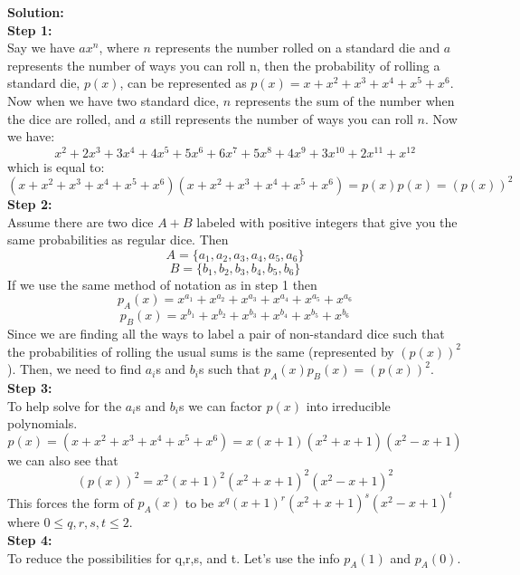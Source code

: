 \documentclass[10pt,a4paper]{report}
\begin{document}
	\newline
	\textbf{Solution: }\\
	\newline
	\textbf{Step 1:}\\
	Say we have $ax^n$, where $n$ represents the number rolled on a standard die and $a$ represents the number of ways you can roll n, then the probability of rolling a standard die, $p(x)$, can be represented as $p(x) = x + x^2 + x^3 + x^4 + x^5 + x^6$.\\
	Now when we have two standard dice, $n$ represents the sum of the number when the dice are rolled, and $a$ still represents the number of ways you can roll $n$.  Now we have:\\
	\[x^2 + 2x^3 + 3x^4 + 4x^5 + 5x^6 + 6x^7 + 5x^8 + 4x^9 + 3x^{10} + 2x^{11} + x^{12} \]
	which is equal to:\\
	\[(x + x^2 + x^3 + x^4 + x^5 + x^6)(x + x^2 + x^3 + x^4 + x^5 + x^6) = p(x)p(x) = (p(x))^2 \]
	\newline
	\textbf{Step 2:}\\
	Assume there are two dice $A+B$ labeled with positive integers that give you the same probabilities as regular dice.  Then \[A = \{a_1, a_2, a_3, a_4, a_5, a_6 \}\]
	\[B = \{b_1, b_2, b_3, b_4, b_5, b_6 \}\]
	If we use the same method of notation as in step 1 then
	\[p_A(x) = x^{a_1} + x^{a_2} + x^{a_3} + x^{a_4} + x^{a_5} + x^{a_6}\]
	\[p_B(x) = x^{b_1} + x^{b_2} + x^{b_3} + x^{b_4} + x^{b_5} + x^{b_6} \]
	Since we are finding all the ways to label a pair of non-standard dice such that the probabilities of rolling the usual sums is the same (represented by $(p(x))^2$).  Then, we need to find $a_i$s and $b_i$s such that $p_A(x)p_B(x) = (p(x))^2$.\\
	\newline
	\textbf{Step 3:}\\
	To help solve for the $a_i$s and $b_i$s we can factor $p(x)$ into irreducible polynomials.
	\[p(x) = (x + x^2 + x^3 + x^4 + x^5 + x^6) = x(x+1)(x^2 + x + 1)(x^2 - x + 1) \]
	we can also see that\\
	\[(p(x))^2 = x^2(x+1)^2(x^2 + x + 1)^2(x^2 - x + 1)^2 \]
	This forces the form of $p_A(x)$ to be $x^q(x+1)^r(x^2+x+1)^s(x^2-x+1)^t$ where $0\leq q,r,s,t\leq2$.\\
	\newline
	\textbf{Step 4:}\\
	To reduce the possibilities for q,r,s, and t. Let's use the info $p_A(1)$ and $p_A(0)$.\\
\end{document}
